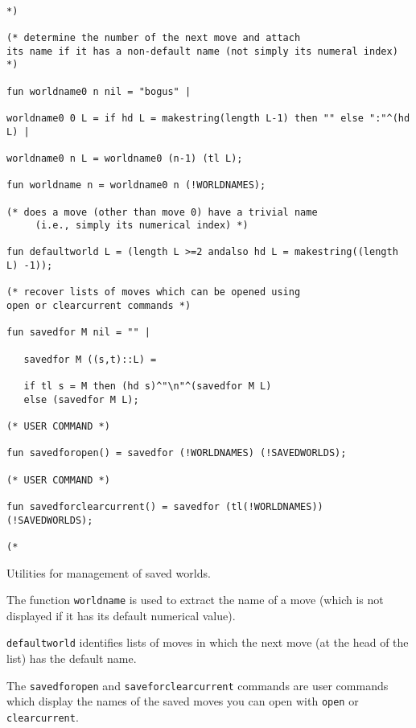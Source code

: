 \documentclass{article}
\begin{document}
\begin{verbatim}

*)

(* determine the number of the next move and attach 
its name if it has a non-default name (not simply its numeral index)  *)

fun worldname0 n nil = "bogus" |

worldname0 0 L = if hd L = makestring(length L-1) then "" else ":"^(hd L) |

worldname0 n L = worldname0 (n-1) (tl L);

fun worldname n = worldname0 n (!WORLDNAMES);

(* does a move (other than move 0) have a trivial name 
     (i.e., simply its numerical index) *)

fun defaultworld L = (length L >=2 andalso hd L = makestring((length L) -1));

(* recover lists of moves which can be opened using
open or clearcurrent commands *)

fun savedfor M nil = "" |

   savedfor M ((s,t)::L) = 

   if tl s = M then (hd s)^"\n"^(savedfor M L)
   else (savedfor M L);

(* USER COMMAND *)

fun savedforopen() = savedfor (!WORLDNAMES) (!SAVEDWORLDS);

(* USER COMMAND *)

fun savedforclearcurrent() = savedfor (tl(!WORLDNAMES)) (!SAVEDWORLDS);

(*

\end{verbatim}

Utilities for management of saved worlds.

The function {\tt worldname} is used 
to extract the name of a move (which is not displayed 
if it has its default numerical value).

{\tt defaultworld} identifies lists of moves 
in which the next move (at the head of the list) has the default name.

The {\tt savedforopen} and {\tt saveforclearcurrent} commands are user commands which display the names of the saved moves
you can open with {\tt open} or {\tt clearcurrent}.
\end{document}
